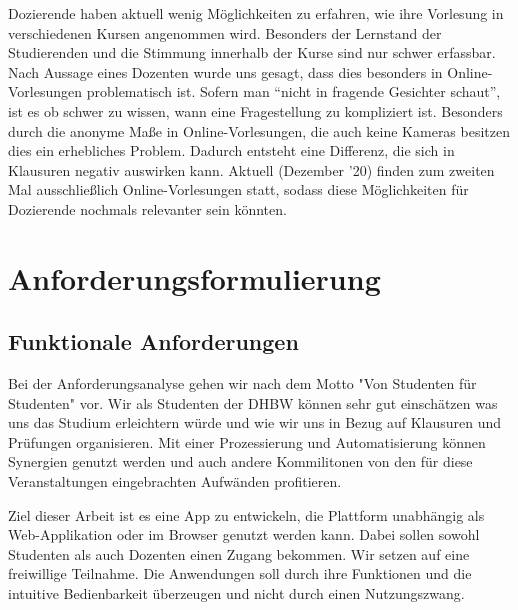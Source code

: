 Dozierende haben aktuell wenig Möglichkeiten zu erfahren, wie ihre Vorlesung in verschiedenen Kursen angenommen wird.
Besonders der Lernstand der Studierenden und die Stimmung innerhalb der Kurse sind nur schwer erfassbar.
Nach Aussage eines Dozenten wurde uns gesagt, dass dies besonders in Online-Vorlesungen problematisch ist.
Sofern man \enquote{nicht in fragende Gesichter schaut}, ist es ob schwer zu wissen, wann eine Fragestellung zu kompliziert ist.
Besonders durch die anonyme Maße in Online-Vorlesungen, die auch keine Kameras besitzen dies ein erhebliches Problem.
Dadurch entsteht eine Differenz, die sich in Klausuren negativ auswirken kann.
Aktuell (Dezember '20) finden zum zweiten Mal ausschließlich Online-Vorlesungen statt, sodass diese Möglichkeiten für Dozierende nochmals relevanter sein könnten.



\section{Anforderungsformulierung}

\subsection{Funktionale Anforderungen} 
Bei der Anforderungsanalyse gehen wir nach dem Motto "Von Studenten für Studenten" vor.
Wir als Studenten der DHBW können sehr gut einschätzen was uns das Studium erleichtern würde und wie wir uns in Bezug auf Klausuren und Prüfungen organisieren.
Mit einer Prozessierung und Automatisierung können Synergien genutzt werden und auch andere Kommilitonen von den für diese Veranstaltungen eingebrachten Aufwänden profitieren.

Ziel dieser Arbeit ist es eine App zu entwickeln, die Plattform unabhängig als Web-Applikation oder im Browser genutzt werden kann.
Dabei sollen sowohl Studenten als auch Dozenten einen Zugang bekommen.
Wir setzen auf eine freiwillige Teilnahme.
Die Anwendungen soll durch ihre Funktionen und die intuitive Bedienbarkeit überzeugen und nicht durch einen Nutzungszwang.


